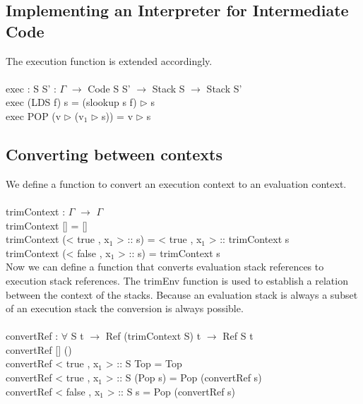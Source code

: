 \documentclass[paper=a4, fontsize=11pt]{scrartcl} %
\numberwithin{equation}{section} %
\numberwithin{figure}{section} %
\numberwithin{table}{section} %
\begin{document}
\subsection{Implementing an Interpreter for Intermediate Code}
The execution function is extended accordingly.\\
\\
\ttfamily
exec : {S S' : $\Gamma$} $\rightarrow$ Code S S' $\rightarrow$ Stack S $\rightarrow$ Stack S'\\
exec (LDS f) s = (slookup s f) $\rhd$ s\\
exec POP (v $\rhd$ (v$_1$ $\rhd$ s)) = v $\rhd$ s\\
\normalfont
\subsection{Converting between contexts}

We define a function to convert an execution context to an evaluation context.\\
\ttfamily
\\
trimContext : $\Gamma$ $\rightarrow$ $\Gamma$\\
trimContext [] = []\\
trimContext (< true , x$_1$ > :: s) = < true , x$_1$ > :: trimContext s\\
trimContext (< false , x$_1$ > :: s) = trimContext s\\

\normalfont
Now we can define a function that converts evaluation stack references to execution stack references. The \ttfamily trimEnv \normalfont function is used to establish a relation between the context of the stacks. Because an evaluation stack is always a subset of an execution stack the conversion is always possible.\\
\ttfamily
\\
convertRef : $\forall$ {S t} $\rightarrow$ Ref (trimContext S) t $\rightarrow$ Ref S t\\
convertRef {[]} ()\\
convertRef {< true , x$_1$ > :: S} Top = Top\\
convertRef {< true , x$_1$ > :: S} (Pop s) = Pop (convertRef s)\\
convertRef {< false , x$_1$ > :: S} s = Pop (convertRef s)\\

\normalfont
\end{document}
